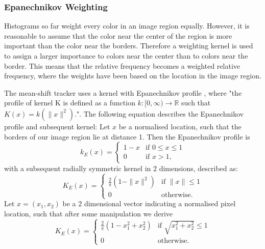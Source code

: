 \documentclass[a4paper,11pt]{article}
\begin{document}
\subsubsection{Epanechnikov Weighting}

Histograms so far weight every color in an image region equally. However, it is reasonable to assume that the color near the center of the region is more important than the color near the borders. Therefore a weighting kernel is used to assign a larger importance to colors near the center than to colors near the border. This means that the relative frequency becomes a weighted relative frequency, where the weights have been based on the location in the image region.

The mean-shift tracker uses a kernel with Epanechnikov profile \cite{mean_shift_epan}, where "the profile of kernel K is defined as a function $k:[0,\infty)\rightarrow\mathbb{R}$ such that $K(x)=k(\|x\|^2)$."\cite{mean_shift}. The following equation describes the Epanechnikov profile and subsequent kernel: 
Let $x$ be a normalised location, such that the borders of our image region lie at distance 1. Then the Epanechnikov profile is
\begin{equation}
\label{eq:epanechnikov_profile}
k_E(x) = \left\{ \begin{array}{cl}
  1-x & \textrm{if } 0 \leq x \leq 1\\
  0 & \textrm{if }  x > 1 ,\end{array}\right.
\end{equation}
with a subsequent radially symmetric kernel in 2 dimensions, described as:
\begin{equation}
\label{eq:epanechnikov_kernel1}
K_E(x) = \left\{ \begin{array}{cl}
  \frac{2}{\pi} (1-\|x\|^2) & \textrm{if } \|x\| \leq 1 \\
  0 & \textrm{otherwise.} \end{array}\right.
\end{equation}
Let $x = (x_1,x_2)$ be a 2 dimensional vector indicating a normalised pixel location, such that after some manipulation we derive
\begin{equation}
\label{eq:epanechnikov_kernel2}
K_E(x) = \left\{ \begin{array}{cl}
  \frac{2}{\pi} (1-x_1^2 + x_2^2) & \textrm{if } \sqrt{x_1^2 + x_2^2} \leq 1 \\
  0 & \textrm{otherwise.} \end{array}\right.
\end{equation}
\end{document}

